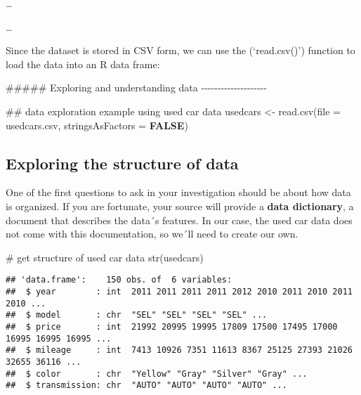 \documentclass[
]{article}
\newenvironment{Shaded}{\begin{snugshade}}{\end{snugshade}}
\newcommand{\AttributeTok}[1]{\textcolor[rgb]{0.80,0.80,0.80}{#1}}
\newcommand{\CommentTok}[1]{\textcolor[rgb]{0.50,0.62,0.50}{#1}}
\newcommand{\ConstantTok}[1]{\textcolor[rgb]{0.86,0.64,0.64}{\textbf{#1}}}
\newcommand{\DocumentationTok}[1]{\textcolor[rgb]{0.50,0.62,0.50}{#1}}
\newcommand{\FunctionTok}[1]{\textcolor[rgb]{0.94,0.94,0.56}{#1}}
\newcommand{\NormalTok}[1]{\textcolor[rgb]{0.80,0.80,0.80}{#1}}
\newcommand{\OtherTok}[1]{\textcolor[rgb]{0.94,0.94,0.56}{#1}}
\newcommand{\StringTok}[1]{\textcolor[rgb]{0.80,0.58,0.58}{#1}}
\begin{document}
\ldots{}

\ldots{}

Since the dataset is stored in CSV form, we can use the (`read.csv()')
function to load the data into an R data frame:

\begin{Shaded}
\begin{Highlighting}[]
\DocumentationTok{\#\#\#\#\# Exploring and understanding data {-}{-}{-}{-}{-}{-}{-}{-}{-}{-}{-}{-}{-}{-}{-}{-}{-}{-}{-}{-}}

\DocumentationTok{\#\# data exploration example using used car data}
\NormalTok{usedcars }\OtherTok{\textless{}{-}} \FunctionTok{read.csv}\NormalTok{(}\AttributeTok{file =} \StringTok{\textquotesingle{}usedcars.csv\textquotesingle{}}\NormalTok{, }\AttributeTok{stringsAsFactors =} \ConstantTok{FALSE}\NormalTok{)}
\end{Highlighting}
\end{Shaded}

\hypertarget{exploring-the-structure-of-data}{%
\subsection{Exploring the structure of
data}\label{exploring-the-structure-of-data}}

One of the first questions to ask in your investigation should be about
how data is organized. If you are fortunate, your source will provide a
\textbf{data dictionary}, a document that describes the data´s features.
In our case, the used car data does not come with this documentation, so
we´ll need to create our own.

\begin{Shaded}
\begin{Highlighting}[]
\CommentTok{\# get structure of used car data}
\FunctionTok{str}\NormalTok{(usedcars)}
\end{Highlighting}
\end{Shaded}

\begin{verbatim}
## 'data.frame':    150 obs. of  6 variables:
##  $ year        : int  2011 2011 2011 2011 2012 2010 2011 2010 2011 2010 ...
##  $ model       : chr  "SEL" "SEL" "SEL" "SEL" ...
##  $ price       : int  21992 20995 19995 17809 17500 17495 17000 16995 16995 16995 ...
##  $ mileage     : int  7413 10926 7351 11613 8367 25125 27393 21026 32655 36116 ...
##  $ color       : chr  "Yellow" "Gray" "Silver" "Gray" ...
##  $ transmission: chr  "AUTO" "AUTO" "AUTO" "AUTO" ...
\end{verbatim}
\end{document}

